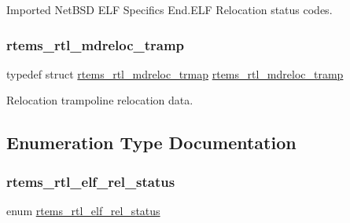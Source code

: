 Imported Net\+B\+SD E\+LF Specifics End.\+E\+LF Relocation status codes. \mbox{\label{rtl-elf_8h_ad711d76aa58e3b5c7380face8f4a5f67}} 
\subsubsection{\texorpdfstring{rtems\_rtl\_mdreloc\_tramp}{rtems\_rtl\_mdreloc\_tramp}}
{\footnotesize\ttfamily typedef struct \mbox{\hyperlink{structrtems__rtl__mdreloc__trmap}{rtems\+\_\+rtl\+\_\+mdreloc\+\_\+trmap}}  \mbox{\hyperlink{rtl-elf_8h_ad711d76aa58e3b5c7380face8f4a5f67}{rtems\+\_\+rtl\+\_\+mdreloc\+\_\+tramp}}}

Relocation trampoline relocation data. 

\subsection{Enumeration Type Documentation}
\mbox{\label{rtl-elf_8h_a97d7ca039fc1123f4ca0c7b43d4a811f}} 
\subsubsection{\texorpdfstring{rtems\_rtl\_elf\_rel\_status}{rtems\_rtl\_elf\_rel\_status}}
{\footnotesize\ttfamily enum \mbox{\hyperlink{rtl-elf_8h_a97d7ca039fc1123f4ca0c7b43d4a811f}{rtems\+\_\+rtl\+\_\+elf\+\_\+rel\+\_\+status}}}


